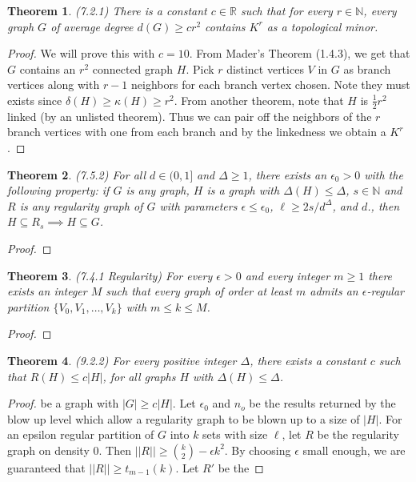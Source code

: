 \documentclass[12pt]{article}
\newtheorem{theorem}{Theorem}
\begin{document}
\begin{theorem} (7.2.1) There is a constant $c \in \mathbb{R}$ such
  that for every $r \in \mathbb{N}$, every graph $G$ of average degree
  $d(G) \geq cr^2$ contains $K^r$ as a topological minor.
\end{theorem}
\begin{proof} We will prove this with $c = 10$. From Mader's Theorem
  (1.4.3), we get that $G$ contains an $r^2$ connected graph $H$. Pick
  $r$ distinct vertices $V$ in $G$ as branch vertices along with $r-1$
  neighbors for each branch vertex chosen. Note they must exists since
  $\delta(H) \geq \kappa(H) \geq r^2$. From another theorem, note that
  $H$ is $\frac{1}{2}r^2$ linked (by an unlisted theorem). Thus we can
  pair off the neighbors of the $r$ branch vertices with one from each
  branch and by the linkedness we obtain a $K^r$.
\end{proof}

\begin{theorem} (7.5.2) For all $d \in (0, 1]$ and
  $\Delta \geq 1$, there exists an $\epsilon_0 > 0$ with the following
  property: if $G$ is any graph, $H$ is a graph with
  $\Delta(H) \leq \Delta$, $s \in \mathbb{N}$ and $R$ is any
  regularity graph of $G$ with parameters $\epsilon \leq \epsilon_0$,
  $\ell \geq 2s/d^\Delta$, and $d$., then
  $H \subseteq R_s \implies H \subseteq G$.
\end{theorem}
\begin{proof}
\end{proof}

\begin{theorem} (7.4.1 Regularity) For every $\epsilon > 0$ and every
  integer $m \geq 1$ there exists an integer $M$ such that every graph
  of order at least $m$ admits an $\epsilon$-regular partition
  $\{V_0, V_1, \ldots, V_k\}$ with $m \leq k \leq M$.
\end{theorem}
\begin{proof}
\end{proof}

\begin{theorem} (9.2.2) For every positive integer $\Delta$, there
  exists a constant $c$ such that $R(H) \leq c |H|$, for all graphs
  $H$ with $\Delta(H) \leq \Delta$.
\end{theorem}
\begin{proof} %
  be a graph with $|G| \geq c |H|$. Let $\epsilon_0$ and $n_o$ be the
  results returned by the blow up level which allow a regularity graph
  to be blown up to a size of $|H|$. For an epsilon regular partition
  of $G$ into $k$ sets with size $\ell$, let $R$ be the regularity
  graph on density $0$. Then
  $||R|| \geq {k \choose 2} - \epsilon k^2$. By choosing $\epsilon$
  small enough, we are guaranteed that $||R|| \geq t_{m - 1}(k)$. Let
  $R'$ be the
\end{proof}
\end{document}
